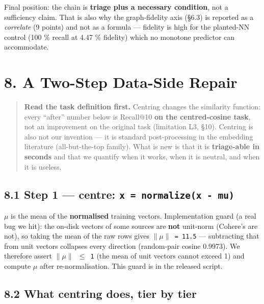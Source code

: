 \documentclass[
  10pt,
]{article}
\begin{document}
Final position: the chain is \textbf{triage plus a necessary condition},
not a sufficiency claim. That is also why the graph-fidelity axis (§6.3)
is reported as a \emph{correlate} (9 points) and not as a formula ---
fidelity is high for the planted-NN control (100 \% recall at 4.47 \%
fidelity) which no monotone predictor can accommodate.

\section{8. A Two-Step Data-Side
Repair}\label{a-two-step-data-side-repair}

\begin{quote}
\textbf{Read the task definition first.} Centring changes the similarity
function: every ``after'' number below is Recall@10 \textbf{on the
centred-cosine task}, not an improvement on the original task
(limitation L3, §10). Centring is also not our invention --- it is
standard post-processing in the embedding literature (all-but-the-top
family). What is new is that it is \textbf{triage-able in seconds} and
that we quantify when it works, when it is neutral, and when it is
useless.
\end{quote}

\subsection{\texorpdfstring{8.1 Step 1 --- centre:
\texttt{x\textquotesingle{}\ =\ normalize(x\ -\ mu)}}{8.1 Step 1 --- centre: x\textquotesingle{} = normalize(x - mu)}}\label{step-1-centre-x-normalizex---mu}

\texttt{$\mu$} is the mean of the \textbf{normalised} training vectors.
Implementation guard (a real bug we hit): the on-disk vectors of some
sources are \textbf{not} unit-norm (Cohere's are not), so taking the
mean of the raw rows gives \texttt{$\|$$\mu$$\|$\ =\ 11.5} --- subtracting that
from unit vectors collapses every direction (random-pair cosine 0.9973).
We therefore assert \texttt{$\|$$\mu$$\|$\ $\leq$\ 1} (the mean of unit vectors cannot
exceed 1) and compute \texttt{$\mu$} after re-normalisation. This guard is
in the released script.

\subsection{8.2 What centring does, tier by
tier}\label{what-centring-does-tier-by-tier}
\end{document}
